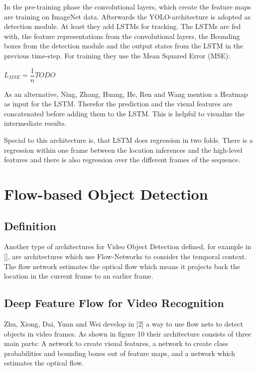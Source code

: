\documentclass[conference]{IEEEtran}
\begin{document}
In the pre-training phase the convolutional layers, which create the feature maps are training on ImageNet data. Afterwards the YOLO-architecture is adopted as detection module. At least they add LSTMs for tracking. The LSTMs are fed with, the feature representations from the convolutional layers, the Bounding boxes from the detection module and the output states from the LSTM in the previous time-step. For training they use the Mean Squared Error (MSE): \newline

$ L_{MSE} = \dfrac{1}{n} TODO $ \newline

As an alternative, Ning, Zhang, Huang, He, Ren and Wang mention a Heatmap as  input for the LSTM. Therefor the prediction and the visual features are concatenated before adding them to the LSTM. This is helpful to visualize the intermediate results. \newline

Special to this architecture is, that LSTM does regression in two folds. There is a regression within one frame between the location inferences and the high-level features and there is also regression over the different frames of the sequence. 

\section{Flow-based Object Detection}

\subsection{Definition}
Another type  of architectures for Video Object Detection defined, for example in [], are architectures which use Flow-Networks to consider the temporal context. The flow network estimates the optical flow which means it projects back the location in the current frame to an earlier frame. 

\subsection{Deep Feature Flow for Video Recognition}
Zhu, Xiong, Dai, Yuan and Wei develop in [2] a way to use flow nets to detect objects in video frames. As shown in figure 10 their architecture consists of three main parts: A network to create visual features, a network to create class probabilities and bounding boxes out of feature maps, and a network which estimates the optical flow. \newline
\end{document}
